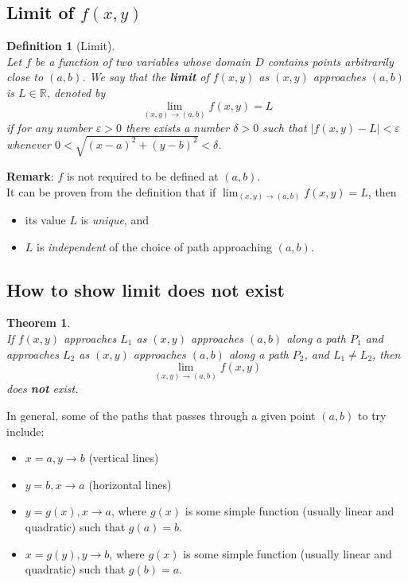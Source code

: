 \documentclass[12pt]{article}
\newtheorem{definition}{Definition}[section]
\newtheorem{theorem}{Theorem}[section]
\theoremstyle{definition}
\begin{document}
\subsection{Limit of $f(x,y)$}
\begin{definition}[Limit]
\hfill\\\normalfont Let $f$ be a function of two variables whose domain $D$ contains points arbitrarily close to $(a,b)$. We say that the \textbf{limit} of $f(x,y)$ as $(x,y)$ approaches $(a,b)$ is $L\in\mathbb{R}$, denoted by
\[
\lim_{(x,y)\to (a,b)}f(x,y)=L
\]
if for any number $\varepsilon>0$ there exists a number $\delta>0$ such that $|f(x,y)-L|<\varepsilon$ whenever $0<\sqrt{(x-a)^2+(y-b)^2}<\delta$.
\end{definition}
\textbf{Remark}: $f$ is not required to be defined at $(a,b)$.\\
It can be proven from the definition that if $\lim_{(x,y)\to (a,b)}f(x,y)=L$, then
\begin{itemize}
  \item its value $L$ is \textit{unique}, and
  \item $L$ is \textit{independent} of the choice of path approaching $(a,b)$.
\end{itemize}
\subsection{How to show limit does not exist}
\begin{theorem}\hfill\\\normalfont If $f(x,y)$ approaches $L_1$ as $(x,y)$ approaches $(a,b)$ along a path $P_1$ and approaches $L_2$ as $(x,y)$ approaches $(a,b)$ along a path $P_2$, and $L_1\neq L_2$, then
\[
\lim_{(x,y)\to (a,b)}f(x,y)
\]
does \textbf{not} exist.
\end{theorem}
In general, some of the paths that passes through a given point $(a,b)$ to try include:
\begin{itemize}
  \item $x=a,y\to b$ (vertical lines)
  \item $y=b, x\to a$ (horizontal lines)
  \item $y=g(x), x\to a$, where $g(x)$ is some simple function (usually linear and quadratic) such that $g(a)=b$.
  \item $x=g(y), y\to b$, where $g(x)$ is some simple function (usually linear and quadratic) such that $g(b)=a$.
\end{itemize}
\end{document}
